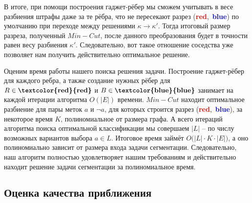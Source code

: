\documentclass[a4paper,12pt]{article}
\begin{document}
В итоге, при помощи построения гаджет-рёбер мы сможем учитывать в весе разбиения штрафы даже за те рёбра, что не пересекают разрез (\textbf{\textcolor{red}{red}},\ \textbf{\textcolor{blue}{blue}}) по умолчанию при переходе между решениями $\kappa \to \kappa'$. Тогда итоговый размер разреза, полученный $Min-Cut$, после данного преобразования будет в точности равен весу разбиения $\kappa'$. Следовательно, вот такое отношение соседства уже позволяет нам получить действительно оптимальное решение.

Оценим время работы нашего поиска решения задачи. Построение гаджет-рёбер для каждого ребра, а также создание нужных рёбер для $R \in \textbf{\textcolor{red}{red}}$ и $B\in \textbf{\textcolor{blue}{blue}}$ занимает на каждой итерации алгоритма $O(|E|)$ времени. $Min-Cut$ находит оптимальное разбиение для пары меток $a$ и $\neg a$, для которых строится разрез (\textbf{\textcolor{red}{red}},\ \textbf{\textcolor{blue}{blue}}), за некоторое время $K$, полиномиальное от размера графа. А всего итераций алгоритма поиска оптимальной классификации мы совершаем $|L|$ -- по числу возможных вариантов выбора $a \in L$. Итоговое время займёт $O\big(|L| \cdot K \cdot |E|\big)$, а оно полиномиально зависит от размера входа задачи сегментации. Следовательно, наш алгоритм полностью удовлетворяет нашим требованиям и действительно находит решение задачи сегментации за полиномиальное время.

\subsection{Оценка качества приближения}
\end{document}
